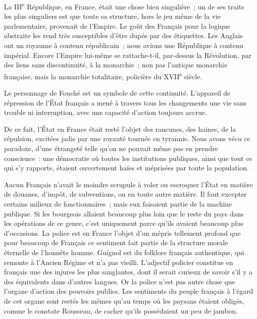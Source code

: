 \documentclass[french,twoside]{book} %
\begin{document}
La III\textsuperscript{e} République, en France, était une chose bien singulière ; un de ses traits les plus singuliers est que toute sa structure, hors le jeu même de la vie parlementaire, provenait de l'Empire. Le goût des Français pour la logique abstraite les rend très susceptibles d’être dupés par des étiquettes. Les Anglais ont un royaume à contenu républicain ; nous avions une République à contenu impérial. Encore l'Empire lui-même se rattache-t-il, par-dessus la Révolution, par des liens sans discontinuité, à la monarchie ; non pas l'antique monarchie française, mais la monarchie totalitaire, policière du XVII\textsuperscript{e} siècle.\par
Le personnage de Fouché est un symbole de cette continuité. L'appareil de répression de l'État français a mené à travers tous les changements une vie sans trouble ni interruption, avec une capacité d'action toujours accrue.\par
De ce fait, l'État en France était resté l'objet des rancunes, des haines, de la répulsion, excitées jadis par une royauté tournée en tyrannie. Nous avons vécu ce paradoxe, d'une étrangeté telle qu'on ne pouvait même pas en prendre conscience : une démocratie où toutes les institutions publiques, ainsi que tout ce qui s'y rapporte, étaient ouvertement haïes et méprisées par toute la population.\par
Aucun Français n'avait le moindre scrupule à voler ou escroquer l'État en matière de douanes, d'impôt, de subventions, ou en toute autre matière. Il faut excepter certains milieux de fonctionnaires ; mais eux faisaient partie de la machine publique. Si les bourgeois allaient beaucoup plus loin que le reste du pays dans les opérations de ce genre, c'est uniquement parce qu'ils avaient beaucoup plus d'occasions. La police est en France l'objet d'un mépris tellement profond que pour beaucoup de Français ce sentiment fait partie de la structure morale éternelle de l'honnête homme. Guignol est du folklore français authentique, qui remonte à l'Ancien Régime et n'a pas vieilli. L'adjectif policier constitue en français une des injures les plus sanglantes, dont il serait curieux de savoir s'il y a des équivalents dans d'autres langues. Or la police n'est pas autre chose que l'organe d'action des pouvoirs publics. Les sentiments du peuple français à l'égard de cet organe sont restés les mêmes qu'au temps où les paysans étaient obligés, comme le constate Rousseau, de cacher qu'ils possédaient un peu de jambon.\par
\end{document}
